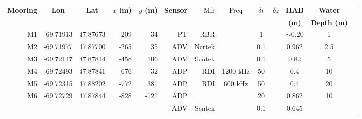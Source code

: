 \documentclass[letterpaper,10pt,landscape]{article}
\begin{document}
\thispagestyle{empty}



\begin{table}
  \centering
  \begin{tabular}{|r|c|c|r|r|r|r|c|c|c|c|c|c|} \hline
    {\bf Mooring}       & {\bf Lon}                  & {\bf Lat}                 & {\bf $x$ (m)}          & {\bf $y$ (m)}         & {\bf Sensor} &Mfr       & Freq     & $\delta t$&$\delta z$& {\bf HAB}  & {\bf Water}         \\
    ~                   &                            &                           &                        &                       &              &          &          &           &          & {\bf (m)}  & {\bf Depth (m)}     \\\hline \hline
    M1                  & -69.71913                  & 47.87673                  & -209                   & 34                    & PT           & RBR      &          & 1         &          & $\sim0.20$ & 1                   \\\hline
    M2                  & -69.71977                  & 47.87700                  & -265                   & 35                    & ADV          & Nortek   &          & 0.1       &          & 0.962      & 2.5                 \\\hline %
    M3                  & -69.72147                  & 47.87844                  & -458                   & 106                   & ADV          & Sontek   &          & 0.1       &          & 0.82       & 5                   \\\hline
    M4                  & -69.72493                  & 47.87841                  & -676                   & -32                   & ADP          & RDI      & 1200 kHz & 50        &          & 0.4        & 10                  \\\hline
    M5                  & -69.72315                  & 47.88202                  & -772                   & 381                   & ADP          & RDI      &  600 kHz & 50        &          & 0.4        & 20                  \\\hline
    \multirow{4}{*}{M6} & \multirow{4}{*}{-69.72729} & \multirow{4}{*}{47.87844} & \multirow{4}{*}{-828}  & \multirow{4}{*}{-121} & ADP          &          &          & 20        &          & 0.862      & \multirow{4}{*}{10} \\ 
    ~                   &                            &                           &                        &                       & ADV          & Sontek   &          & 0.1       &          & 0.645      &                     \\ 

\end{tabular}
\end{table}
\end{document}

